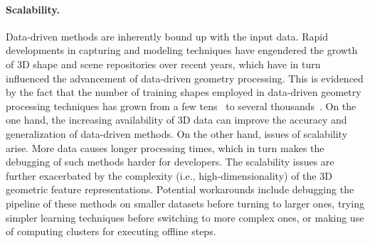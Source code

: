 \paragraph*{Scalability.}
Data-driven methods are inherently bound up with the input data.
Rapid developments in capturing and modeling techniques have engendered the growth of
3D shape and scene repositories over recent years, which  have  in turn influenced the advancement of data-driven geometry processing.
This is evidenced by the fact that the number of training shapes employed in data-driven geometry
processing  techniques has grown from a few tens~\cite{Kalogerakis:2010:LMS,Sidi:2011:CS}
to several thousands~\cite{Kim:2013:lpt,Huang:2014:FMN}. On the one hand, the increasing
availability of 3D data can improve the accuracy and generalization of data-driven
methods. On the other hand, issues of scalability arise. More data causes
longer processing times, which in turn makes the debugging of such methods harder for developers. The scalability issues are further
exacerbated by the complexity (i.e., high-dimensionality) of the 3D geometric feature representations. Potential workarounds include debugging
the pipeline of these methods on smaller datasets before turning to larger ones,  trying simpler learning techniques before switching to more complex ones, or making use of computing clusters for executing offline steps.%

